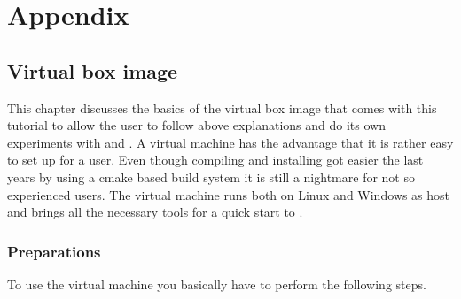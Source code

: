 \documentclass[10pt,fleqn]{book}
\begin{document}
\appendix
\part{Appendix}

\chapter{Virtual box image}

This chapter discusses the basics of the virtual box image that comes with this tutorial to allow the user to follow above explanations and do its own experiments with \muelu and \trilinos. A virtual machine has the advantage that it is rather easy to set up for a user. Even though compiling and installing got easier the last years by using a cmake based build system it is still a nightmare for not so experienced users. The virtual machine runs both on Linux and Windows as host and brings all the necessary tools for a quick start to \muelu.

\section{Preparations}

To use the virtual machine you basically have to perform the following steps.
\end{document}

